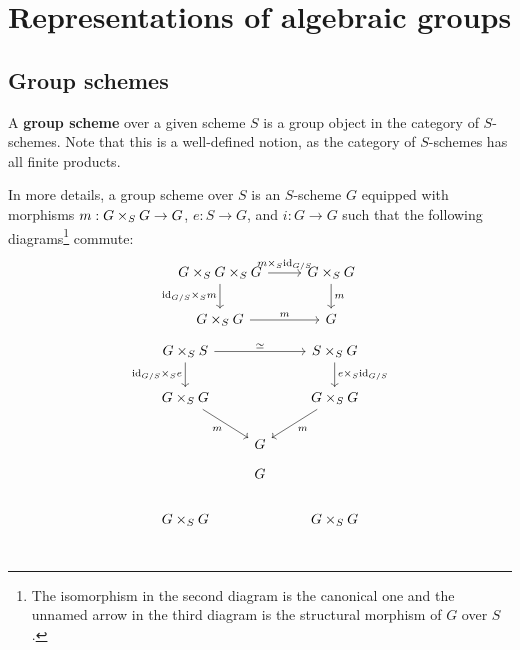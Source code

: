 \section{Representations of algebraic groups}
    \subsection{Group schemes}
        \begin{definition} \label{def: group_schemes}
            A \textbf{group scheme} over a given scheme $S$ is a group object in the category of $S$-schemes. Note that this is a well-defined notion, as the category of $S$-schemes has all finite products.
            
            In more details, a group scheme over $S$ is an $S$-scheme $G$ equipped with morphisms $m: G \x_S G \to G$, $e: S \to G$, and $i: G \to G$ such that the following diagrams\footnote{The isomorphism in the second diagram is the canonical one and the unnamed arrow in the third diagram is the structural morphism of $G$ over $S$.} commute:
                $$
                    \begin{tikzcd}
                        {G \x_S G \x_S G} & {G \x_S G} \\
                        {G \x_S G} & G
                        \arrow["{\id_{G/S} \x_S m}"', from=1-1, to=2-1]
                        \arrow["m", from=2-1, to=2-2]
                        \arrow["{m \x_S \id_{G/S}}", from=1-1, to=1-2]
                        \arrow["m", from=1-2, to=2-2]
                    \end{tikzcd}
                $$
                $$
                    \begin{tikzcd}
                        {G \x_S S} && {S \x_S G} \\
                        {G \x_S G} && {G \x_S G} \\
                        & G
                        \arrow["m"', from=2-1, to=3-2]
                        \arrow["{e \x_S \id_{G/S}}", from=1-3, to=2-3]
                        \arrow["m", from=2-3, to=3-2]
                        \arrow["{\id_{G/S} \x_S e}"', from=1-1, to=2-1]
                        \arrow["\cong", from=1-1, to=1-3]
                    \end{tikzcd}
                $$
                $$
                    \begin{tikzcd}
                        & G \\
                        {G \x_S G} && {G \x_S G} \\

\end{tikzcd}$$
\end{definition}
